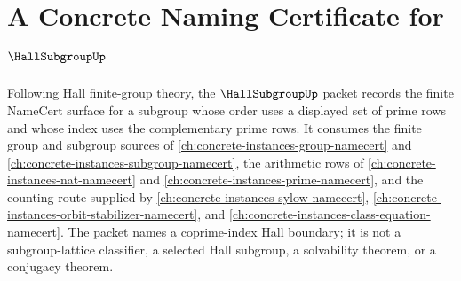 \chapter{A Concrete Naming Certificate for $\HallSubgroupUp$}
\label{ch:concrete-instances-hall-subgroup-namecert}

Following Hall finite-group theory, the $\HallSubgroupUp$ packet records the finite NameCert surface for a subgroup whose order uses a displayed set of prime rows and whose index uses the complementary prime rows. It consumes the finite group and subgroup sources of \autoref{ch:concrete-instances-group-namecert} and \autoref{ch:concrete-instances-subgroup-namecert}, the arithmetic rows of \autoref{ch:concrete-instances-nat-namecert} and \autoref{ch:concrete-instances-prime-namecert}, and the counting route supplied by \autoref{ch:concrete-instances-sylow-namecert}, \autoref{ch:concrete-instances-orbit-stabilizer-namecert}, and \autoref{ch:concrete-instances-class-equation-namecert}. The packet names a coprime-index Hall boundary; it is not a subgroup-lattice classifier, a selected Hall subgroup, a solvability theorem, or a conjugacy theorem.

